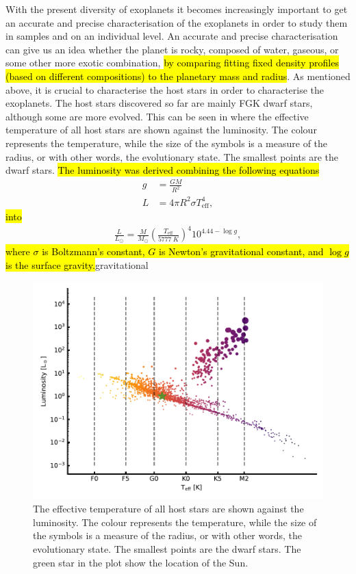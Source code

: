 With the present diversity of exoplanets it becomes increasingly important to get an accurate and
precise characterisation of the exoplanets in order to study them in samples and on an individual
level. An accurate and precise characterisation can give us an idea whether the planet is rocky,
composed of water, gaseous, or some other more exotic combination, \hl{by comparing fitting fixed
density profiles (based on different compositions) to the planetary mass and radius}. As mentioned
above, it is crucial to characterise the host stars in order to characterise the exoplanets. The
host stars discovered so far are mainly FGK dwarf stars, although some are more evolved. This can be
seen in  where the effective temperature of all host stars are shown
against the luminosity. The colour represents the temperature, while the size of the symbols is a
measure of the radius, or with other words, the evolutionary state. The smallest points are the
dwarf stars. \hl{The luminosity was derived combining the following equations}
\begin{align*}
  g &= \frac{GM}{R^2} \\
  L &= 4\pi R^2 \sigma T_\mathrm{eff}^4,
\end{align*}
\hl{into}
\begin{align}
  \frac{L}{L_\odot} = \frac{M}{M_\odot} \left(\frac{T_\mathrm{eff}}{\SI{5777}{K}}\right)^4 10^{4.44-\log g},
\end{align}
\hl{where $\sigma$ is Boltzmann's constant, $G$ is Newton's gravitational constant, and $\log g$ is
the surface gravity.}gravitational

\begin{figure}[htpb!]
    \centering
    \includegraphics[width=1.0\linewidth]{figures/hostDistribution.pdf}
    \caption{The effective temperature of all host stars are shown against the luminosity. The
             colour represents the temperature, while the size of the symbols is a measure of the
             radius, or with other words, the evolutionary state. The smallest points are the dwarf
             stars. The green star in the plot show the location of the Sun.}
    \label{fig:hostDistribution}
\end{figure}

